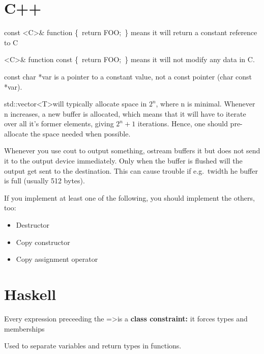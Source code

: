 \section{C++}

const \textless{C}\textgreater\& function \{\ return FOO;\ \}
means it will return a constant reference to C

\textless{C}\textgreater\& function const \{\ return FOO;\ \}
means it will not modify any data in C.

const char *var is a pointer to a constant value, not a const pointer
(char const *var).


std::vector\textless{T}\textgreater will typically allocate space in $2^{n}$, where n is minimal.
Whenever n increases, a new buffer is allocated, which means that it will
have to iterate over all it's former elements, giving ${2^n+1}$ iterations.
Hence, one should pre-allocate the space needed when possible.

Whenever you use cout to output something, ostream buffers it but does not send
it to the output device immediately. Only when the buffer is flushed will the
output get sent to the destination. This can cause trouble if e.g.\
twidth he buffer is full (usually 512 bytes).

\begin{definition}
    If you implement at least one of the following, you should implement
    the others, too:
    \begin{itemize}
        \item Destructor 
        \item Copy constructor 
        \item Copy assignment operator 
    \end{itemize}
\end{definition}

\section{Haskell}
\begin{definition}[=\textgreater]
    Every expression preceeding the =\textgreater is a 
    \textbf{class constraint:} it forces types and memberships

\end{definition}

\begin{definition}[-\textgreater]
    Used to separate variables and return types in functions.
\end{definition}

